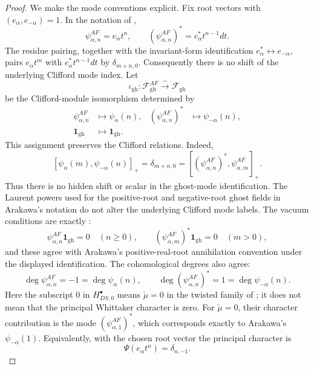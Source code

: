 \documentclass[12pt,leqno]{amsart}
\numberwithin{equation}{section}
\newcommand{\one}{\mathbf{1}}
\begin{document}
\begin{proof}
We make the mode conventions explicit.  Fix root vectors with
$(e_\alpha,e_{-\alpha})=1$.  In the notation of
\cite{ArakawaFrenkel},
\[
 \psi^{AF}_{\alpha,n}=e_\alpha t^n,
 \qquad
 (\psi^{AF}_{\alpha,n})^*=e_\alpha^*t^{n-1}dt.
\]
The residue pairing, together with the invariant-form identification
$e_\alpha^*\leftrightarrow e_{-\alpha}$, pairs
$e_\alpha t^m$ with $e_\alpha^*t^{n-1}dt$ by $\delta_{m+n,0}$.
Consequently there is no shift of the underlying Clifford mode
index.  Let
\[
 \iota_{\mathrm{gh}}:\mathcal F^{AF}_{\mathrm{gh}}
 \xrightarrow{\sim}\mathcal F_{\mathrm{gh}}
\]
be the Clifford-module isomorphism determined by
\[
 \begin{aligned}
 \psi^{AF}_{\alpha,n}&\longmapsto\psi_\alpha(n),&
 (\psi^{AF}_{\alpha,n})^*&\longmapsto\psi_{-\alpha}(n),\\
 \one_{\mathrm{gh}}&\longmapsto\one_{\mathrm{gh}}.&&
 \end{aligned}
\]
This assignment preserves the Clifford relations.  Indeed,
\[
 [\psi_\alpha(m),\psi_{-\alpha}(n)]_+
 =\delta_{m+n,0}
 =[(\psi^{AF}_{\alpha,n})^*,\psi^{AF}_{\alpha,m}]_+.
\]
Thus there is no hidden shift or scalar in the ghost-mode
identification.  The Laurent powers used for the positive-root and negative-root ghost
fields in Arakawa's notation do not alter the underlying Clifford mode
labels.  The vacuum conditions are exactly
\cite[(2.3)]{ArakawaFrenkel}:
\[
 \psi^{AF}_{\alpha,n}\one_{\mathrm{gh}}=0\quad(n\ge0),
 \qquad
 (\psi^{AF}_{\alpha,m})^*\one_{\mathrm{gh}}=0\quad(m>0),
\]
and these agree with Arakawa's positive-real-root annihilation convention
under the displayed identification.  The cohomological degrees also agree:
\[
 \deg\psi^{AF}_{\alpha,n}=-1=\deg\psi_\alpha(n),
 \qquad
 \deg(\psi^{AF}_{\alpha,n})^*=1=\deg\psi_{-\alpha}(n).
\]
Here the subscript $0$ in $H^\bullet_{DS,0}$ means
$\check\mu=0$ in the twisted family of \cite{ArakawaFrenkel}; it does
not mean that the principal Whittaker character is zero.  For
$\check\mu=0$, their character contribution is the mode
$(\psi^{AF}_{\alpha,1})^*$, which corresponds exactly to Arakawa's
$\psi_{-\alpha}(1)$.  Equivalently, with the chosen root vector the
principal character is
\[
 \Psi(e_\alpha t^n)=\delta_{n,-1}.
\]


\end{proof}
\end{document}
